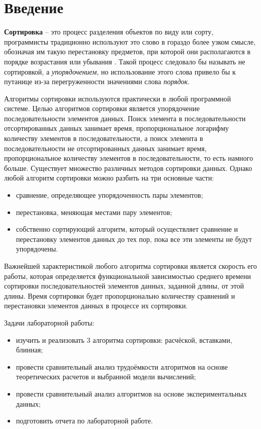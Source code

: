\chapter*{Введение}

\textbf{Сортировка} -- это процесс разделения объектов по виду или сорту, программисты традиционно используют это слово в гораздо более узком смысле, обозначая им такую перестановку предметов, при которой они располагаются в порядке возрастания или убывания \cite{knut}.
Такой процесс следовало бы называть не сортировкой, а \textit{упорядочением}, но использование этого слова привело бы к путанице из-за перегруженности значениями слова \textit{порядок}.

Алгоритмы сортировки используются практически в любой программной системе.
Целью алгоритмов сортировки является упорядочение последовательности элементов данных.
Поиск элемента в последовательности отсортированных данных занимает время, пропорциональное логарифму количеству элементов в последовательности, а поиск элемента в последовательности не отсортированных данных занимает время, пропорциональное количеству элементов в последовательности, то есть намного больше.
Существует множество различных методов сортировки данных.
Однако любой алгоритм сортировки можно разбить на три основные части:
\begin{itemize}
    \item сравнение, определяющее упорядоченность пары элементов;
    \item перестановка, меняющая местами пару элементов;
    \item собственно сортирующий алгоритм, который осуществляет сравнение и перестановку элементов данных до тех пор, пока все эти элементы не будут упорядочены.
\end{itemize}

Важнейшей характеристикой любого алгоритма сортировки является скорость его работы, которая определяется функциональной зависимостью среднего времени сортировки последовательностей элементов данных, заданной длины, от этой длины. Время сортировки будет пропорционально количеству сравнений и перестановки элементов данных в процессе их сортировки.

\clearpage
Задачи лабораторной работы:
\begin{itemize}
	\item изучить и реализовать 3 алгоритма сортировки: расчёской, вставками, блинная;
	\item провести сравнительный анализ трудоёмкости алгоритмов на основе теоретических расчетов и выбранной модели вычислений;
	\item провести сравнительный анализ алгоритмов на основе экспериментальных данных;
    \item подготовить отчета по лабораторной работе.
\end{itemize}

